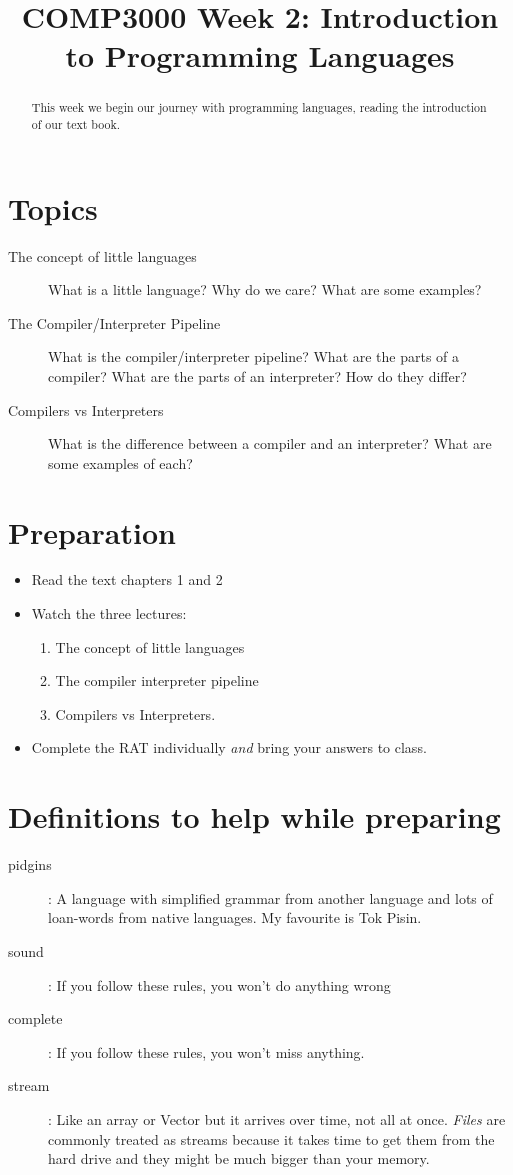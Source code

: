 \documentclass[twoside=false, DIV=14]{scrartcl}
\title{\color{redish} \vspace{-1em}COMP3000 Week 2: Introduction to Programming Languages}
\begin{document}
{\color{blackish}\maketitle}\vspace{-7em}

\begin{abstract}
  This week we begin our journey with programming languages, reading the introduction of our text book.
\end{abstract}

\section*{Topics}
\begin{description}
\item[The concept of little languages]  What is a little language?  Why do we care?  What are some examples?
\item[The Compiler/Interpreter Pipeline]  What is the compiler/interpreter pipeline?  What are the parts of a compiler?  What are the parts of an interpreter?  How do they differ?
\item[Compilers vs Interpreters]  What is the difference between a compiler and an interpreter?  What are some examples of each?
\end{description}
\section*{Preparation}
\begin{itemize}
\item Read the text chapters 1 and 2
\item Watch the three lectures: 
\begin{enumerate}
\item The concept of little languages
\item The compiler interpreter pipeline
\item Compilers vs Interpreters.
\end{enumerate}
\item Complete the RAT individually \emph{and} bring your answers to class.
\end{itemize}

\section*{Definitions to help while preparing}
\begin{description}
\item[pidgins]: A language with simplified grammar from another language and lots of loan-words from native languages.  My favourite is Tok Pisin.
\item[sound]: If you follow these rules, you won't do anything wrong
\item[complete]: If you follow these rules, you won't miss anything.
\item[stream]: Like an array or Vector but it arrives over time, not all at once.  \emph{Files} are commonly treated as streams because it takes time to get them from the hard drive and they might be much bigger than your memory.
\end{description}
\end{document}
